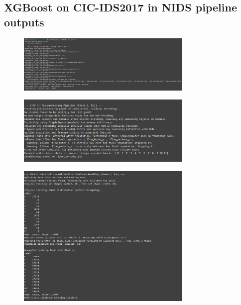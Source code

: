 \subsection*{XGBoost on CIC-IDS2017 in NIDS pipeline outputs}
\begin{figure}[H]
     \centering
     \includegraphics[width=0.75\textwidth]{assets/figures/outputs/1.png}
 \end{figure}
 
 \begin{figure}[H]
     \centering
     \includegraphics[width=0.75\textwidth]{assets/figures/outputs/2.png}
 \end{figure}
 
 \begin{figure}[H]
     \centering
     \includegraphics[width=0.75\textwidth]{assets/figures/outputs/3.png}
 \end{figure}
 
